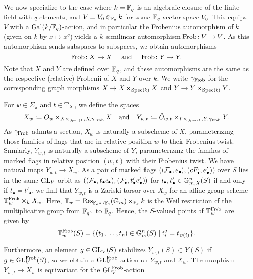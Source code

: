 \documentclass[../main.tex]{subfiles}
\begin{document}
We now specialize to the case where $k = \overline {\mathbb{F}}_q$ is an algebraic closure of 
the finite field with $q$ elements, and $V = V_0 \otimes_{\mathbb{F}_q} k$ for 
some $\mathbb{F}_q$-vector space $V_0$. 
This equips $V$ with a $\operatorname{Gal}(k/\mathbb{F}_q)$-action, and in particular the Frobenius
automorphism of $k$ (given on $k$ by $x\mapsto x^q$) yields a $k$-semilinear
automorphism $\mathrm{Frob}\colon  V \to V$. As this automorphism sends subspaces to
subspaces, we obtain automorphisms 
\begin{equation*}
  \mathrm{Frob}\colon  X \to X \quad \text{ and } \quad \mathrm{Frob}\colon  Y \to Y.
\end{equation*}
Note that $X$ and $Y$ are defined over $\mathbb{F}_q$, and these automorphisms are 
the same as the respective (relative) Frobenii of $X$ and $Y$ over $k$. We write
$\gamma_{\mathrm{Frob}}$ for the corresponding graph morphisms $X \to X \times_{\operatorname{Spec}(k)} X$ and $Y \to Y\times_{\operatorname{Spec}(k)} Y$.

For $w \in \Sigma_n$ and $t \in \mathbb{T}_X$, we define the spaces
\begin{equation}\label{eq:defXYsigma}
  X_w \coloneqq O_w \times_{X \times_{\operatorname{Spec}(k)}X, \gamma_{\mathrm{Frob}}} X
  \quad \text{and} \quad
  Y_{w,t} \coloneqq \tilde O_{w,t} \times_{Y \times_{\operatorname{Spec}(k)}Y,
  \gamma_{\mathrm{Frob}}} Y.
\end{equation}
As $\gamma_{\mathrm{Frob}}$ admits a section, $X_w$ is naturally a subscheme of $X$,
parameterizing those families of flags that are in relative position
$w$ to their Frobenius twist. Similarly, $Y_{w, t}$ is naturally a subscheme of $Y$,
parameterizing the families of marked flags in relative position $(w,t)$ with their
Frobenius twist. 
We have natural maps $Y_{w, t} \to X_w$. 
As a pair of marked flags $((\mathcal{F}_\bullet, e_\bullet), (cF_\bullet', e_\bullet'))$ over $S$
lies in the same $\operatorname{GL}_V$ orbit as $((\mathcal{F}_\bullet, t_\bullet e_\bullet), (\mathcal{F}_\bullet', t'_\bullet
e_\bullet'))$ for $t_\bullet, t'_\bullet \in \mathbb{G}_{m,X}^n(S)$ if and only if 
$t_\bullet = t'_\bullet$, we find that $Y_{w,t}$ is a
Zariski torsor over $X_w$ for an affine group scheme $\mathbb{T}_w^{\mathrm{Frob}} \times_k
X_w$. Here, $\mathbb{T}_w = \operatorname{Res}_{\mathbb{F}_{q^n}/\mathbb{F}_{q}}(\mathbb{G}_m) \times_{\mathbb{F}_q} k$ is the
Weil restriction of the multiplicative group from $\mathbb{F}_{q^n}$ to $\mathbb{F}_q$. 
Hence, the $S$-valued points of $\mathbb{T}_w^{\mathrm{Frob}}$ are given by
\begin{equation*}
  \mathbb{T}_{w}^{\mathrm{Frob}}(S) = \{(t_1, \dots, t_n) \in \mathbb{G}_{m}^n(S) \mid 
    t_i^q = t_{w(i)}\}.
\end{equation*}

Furthermore, an element $g \in \operatorname{GL}_V(S)$ stabilizes $Y_{w,t}(S) \subset Y(S)$ if
$g \in \operatorname{GL}_V^{\mathrm{Frob}}(S)$, so we obtain a $\operatorname{GL}_V^{\mathrm{Frob}}$ action on $Y_{w,t}$ and 
$X_w$. The morphism $Y_{w,t} \to X_w$ is equivariant for the $\operatorname{GL}_V^{\mathrm{Frob}}$-action.
\end{document}
